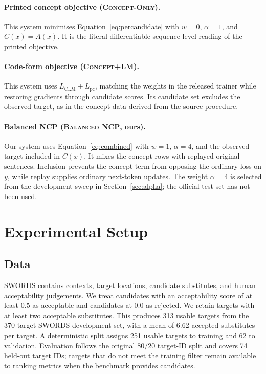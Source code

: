 \documentclass[11pt]{article}
\newcommand{\peq}{\textsc{Concept-Only}}
\newcommand{\pcode}{\textsc{Concept+LM}}
\newcommand{\method}{\textsc{Balanced NCP}}
\begin{document}
\paragraph{Printed concept objective (\peq{}).}
This system minimises Equation~\ref{eq:percandidate} with $w=0$, $\alpha=1$, and
$C(x)=A(x)$. It is the literal differentiable sequence-level reading of the
printed objective.

\paragraph{Code-form objective (\pcode{}).}
This system uses $L_{\mathrm{CLM}}+L_{\mathrm{pc}}$, matching the weights in the
released trainer while restoring gradients through candidate scores. Its
candidate set excludes the observed target, as in the concept data derived from
the source procedure.

\paragraph{Balanced NCP (\method{}, ours).}
Our system uses Equation~\ref{eq:combined} with $w=1$, $\alpha=4$, and the
observed target included in $C(x)$. It mixes the concept rows with replayed
original sentences. Inclusion prevents the concept term from opposing the
ordinary loss on $y$, while replay supplies ordinary next-token updates. The
weight $\alpha=4$ is selected from the development sweep in
Section~\ref{sec:alpha}; the official test set has not been used.

\section{Experimental Setup}

\subsection{Data}

SWORDS contains contexts, target locations, candidate substitutes, and human
acceptability judgements. We treat candidates with an acceptability score of at
least $0.5$ as acceptable and candidates at $0.0$ as rejected. We retain targets
with at least two acceptable substitutes. This produces 313 usable targets from
the 370-target SWORDS development set, with a mean of 6.62 accepted substitutes
per target. A deterministic split assigns 251 usable targets to training and 62
to validation. Evaluation follows the original 80/20 target-ID split and covers
74 held-out target IDs; targets that do not meet the training filter remain
available to ranking metrics when the benchmark provides candidates.
\end{document}
